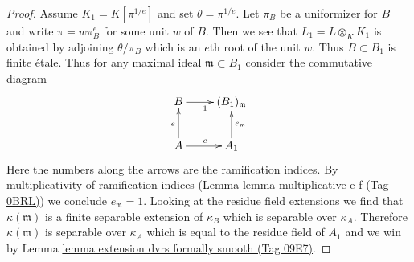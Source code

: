 \documentclass{amsart}
\theoremstyle{plain}
\theoremstyle{definition}
\theoremstyle{remark}
\numberwithin{equation}{subsection}
\begin{document}
\begin{proof}
\medskip\noindent
Assume $K_1 = K[\pi^{1/e}]$ and set $\theta = \pi^{1/e}$. Let $\pi_B$ be a
uniformizer for $B$ and write $\pi = w \pi_B^e$ for some unit $w$ of $B$.
Then we see that $L_1 = L \otimes_K K_1$ is obtained by adjoining
$\theta / \pi_B$ which is an $e$th root of the unit $w$. Thus
$B \subset B_1$ is finite \'etale. Thus for any maximal ideal
$\mathfrak m \subset B_1$ consider the commutative diagram
$$
\xymatrix{
B \ar[r]_1 & (B_1)_{\mathfrak m} \\
A \ar[u]^e \ar[r]^e & A_1 \ar[u]_{e_\mathfrak m}
}
$$
Here the numbers along the arrows are the ramification indices.
By multiplicativity of ramification indices
(Lemma \href{https://stacks.math.columbia.edu/tag/0BRL}{lemma multiplicative e f (Tag 0BRL)})
we conclude $e_\mathfrak m = 1$. Looking at the residue field extensions
we find that $\kappa(\mathfrak m)$ is a finite separable extension
of $\kappa_B$ which is separable over $\kappa_A$. Therefore
$\kappa(\mathfrak m)$ is separable over $\kappa_A$
which is equal to the residue field of $A_1$ and we win by
Lemma \href{https://stacks.math.columbia.edu/tag/09E7}{lemma extension dvrs formally smooth (Tag 09E7)}.
\end{proof}
\end{document}
